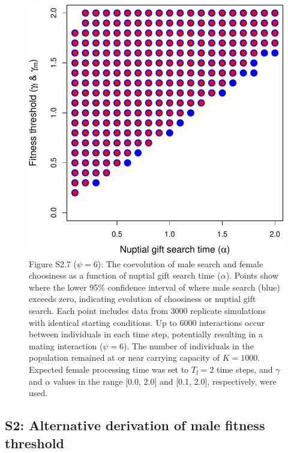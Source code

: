 \documentclass[
]{article}
\begin{document}
\begin{figure}
\centering
\includegraphics{index_files/figure-latex/unnamed-chunk-10-1.pdf}
\caption{Figure S2.7 (\(\psi = 6\)): The coevolution of male search and
female choosiness as a function of nuptial gift search time
(\(\alpha\)). Points show where the lower 95\% confidence interval of
where male search (blue) exceeds zero, indicating evolution of
choosiness or nuptial gift search. Each point includes data from 3000
replicate simulations with identical starting conditions. Up to 6000
interactions occur between individuals in each time step, potentially
resulting in a mating interaction (\(\psi = 6\)). The number of
individuals in the population remained at or near carrying capacity of
\(K = 1000\). Expected female processing time was set to
\(T_{\mathrm{f}}=2\) time steps, and \(\gamma\) and \(\alpha\) values in
the range {[}0.0, 2.0{]} and {[}0.1, 2.0{]}, respectively, were used.}
\end{figure}

\captionsetup{labelformat=default}

\clearpage

\hypertarget{s2-alternative-derivation-of-male-fitness-threshold}{%
\subsection{S2: Alternative derivation of male fitness
threshold}\label{s2-alternative-derivation-of-male-fitness-threshold}}
\end{document}
